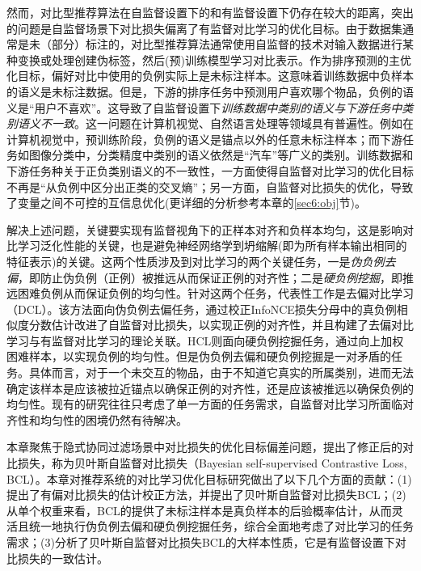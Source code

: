 然而，对比型推荐算法在自监督设置下的和有监督设置下仍存在较大的距离，突出的问题是自监督场景下对比损失偏离了有监督对比学习的优化目标。由于数据集通常是未（部分）标注的，对比型推荐算法通常使用自监督的技术对输入数据进行某种变换或处理创建伪标签，然后(预)训练模型学习对比表示。作为排序预测的主优化目标，偏好对比中使用的负例实际上是未标注样本。这意味着训练数据中负样本的语义是未标注数据。但是，下游的排序任务中预测用户喜欢哪个物品，负例的语义是“用户不喜欢”。这导致了自监督设置下\textit{训练数据中类别的语义与下游任务中类别语义不一致}。这一问题在计算机视觉、自然语言处理等领域具有普遍性。例如在计算机视觉中，预训练阶段，负例的语义是锚点以外的任意未标注样本；而下游任务如图像分类中，分类精度中类别的语义依然是“汽车”等广义的类别。训练数据和下游任务种关于正负类别语义的不一致性，一方面使得自监督对比学习的优化目标不再是“从负例中区分出正类的交叉熵”；另一方面，自监督对比损失的优化，导致了变量之间不可控的互信息优化(更详细的分析参考本章的\ref{sec6:obj}节)。

解决上述问题，关键要实现有监督视角下的正样本对齐和负样本均匀，这是影响对比学习泛化性能的关键\cite{Wang:2020:ICML,Arora:2019:ICML}，也是避免神经网络学到坍缩解(即为所有样本输出相同的特征表示)的关键\cite{BYOL:2020:NIPS,He:2020:CVPR}。这两个性质涉及到对比学习的两个关键任务，一是\textit{伪负例去偏}，即防止伪负例（正例）被推远从而保证正例的对齐性；二是\textit{硬负例挖掘}，即推远困难负例从而保证负例的均匀性。针对这两个任务，代表性工作是去偏对比学习（DCL）\cite{Chuang:2020:NIPS}。该方法面向伪负例去偏任务，通过校正InfoNCE损失分母中的真负例相似度分数估计改进了自监督对比损失，以实现正例的对齐性，并且构建了去偏对比学习与有监督对比学习的理论关联。HCL\cite{Robinson:2021:ICLR}则面向硬负例挖掘任务，通过向上加权困难样本，以实现负例的均匀性。但是伪负例去偏和硬负例挖掘是一对矛盾的任务\cite{zhang:cl}。具体而言，对于一个未交互的物品，由于不知道它真实的所属类别，进而无法确定该样本是应该被拉近锚点以确保正例的对齐性，还是应该被推远以确保负例的均匀性。现有的研究往往只考虑了单一方面的任务需求，自监督对比学习所面临对齐性和均匀性的困境仍然有待解决\cite{zhang:cl,Feng:2021:CVPR,Liu:2021:TKDE}。

本章聚焦于隐式协同过滤场景中对比损失的优化目标偏差问题，提出了修正后的对比损失，称为贝叶斯自监督对比损失（Bayesian self-supervised Contrastive Loss, BCL）。本章对推荐系统的对比学习优化目标研究做出了以下几个方面的贡献：(1)提出了有偏对比损失的估计校正方法，并提出了贝叶斯自监督对比损失BCL；(2)从单个权重来看，BCL的提供了未标注样本是真负样本的后验概率估计，从而灵活且统一地执行伪负例去偏和硬负例挖掘任务，综合全面地考虑了对比学习的任务需求；(3)分析了贝叶斯自监督对比损失BCL的大样本性质，它是有监督设置下对比损失的一致估计。

